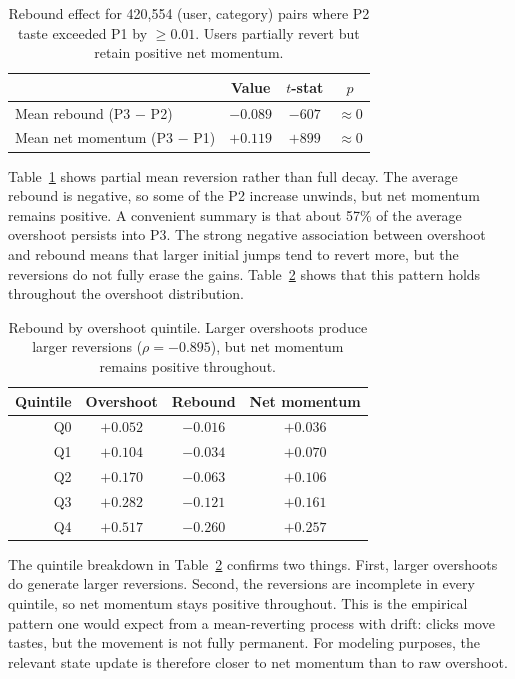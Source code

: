 \documentclass[11pt]{article}
\begin{document}
\begin{table}[ht]
\centering
\caption{Rebound effect for 420,554 (user, category) pairs where P2 taste exceeded P1 by $\geq 0.01$. Users partially revert but retain positive net momentum.}
\label{tab:rebound}
\begin{tabular}{lccc}
\toprule
 & Value & $t$-stat & $p$ \\
\midrule
Mean rebound (P3 $-$ P2) & $-0.089$ & $-607$ & $\approx 0$ \\
Mean net momentum (P3 $-$ P1) & $+0.119$ & $+899$ & $\approx 0$ \\
\bottomrule
\end{tabular}
\end{table}
\FloatBarrier

Table~\ref{tab:rebound} shows partial mean reversion rather than full decay. The average rebound is negative, so some of the P2 increase unwinds, but net momentum remains positive. A convenient summary is that about 57\% of the average overshoot persists into P3. The strong negative association between overshoot and rebound means that larger initial jumps tend to revert more, but the reversions do not fully erase the gains. Table~\ref{tab:rebound_quintile} shows that this pattern holds throughout the overshoot distribution.
\begin{table}[ht]
\centering
\caption{Rebound by overshoot quintile. Larger overshoots produce larger reversions ($\rho = -0.895$), but net momentum remains positive throughout.}
\label{tab:rebound_quintile}
\begin{tabular}{rccc}
\toprule
Quintile & Overshoot & Rebound & Net momentum \\
\midrule
Q0 & $+0.052$ & $-0.016$ & $+0.036$ \\
Q1 & $+0.104$ & $-0.034$ & $+0.070$ \\
Q2 & $+0.170$ & $-0.063$ & $+0.106$ \\
Q3 & $+0.282$ & $-0.121$ & $+0.161$ \\
Q4 & $+0.517$ & $-0.260$ & $+0.257$ \\
\bottomrule
\end{tabular}
\end{table}
\FloatBarrier

The quintile breakdown in Table~\ref{tab:rebound_quintile} confirms two things. First, larger overshoots do generate larger reversions. Second, the reversions are incomplete in every quintile, so net momentum stays positive throughout. This is the empirical pattern one would expect from a mean-reverting process with drift: clicks move tastes, but the movement is not fully permanent. For modeling purposes, the relevant state update is therefore closer to net momentum than to raw overshoot.
\end{document}
